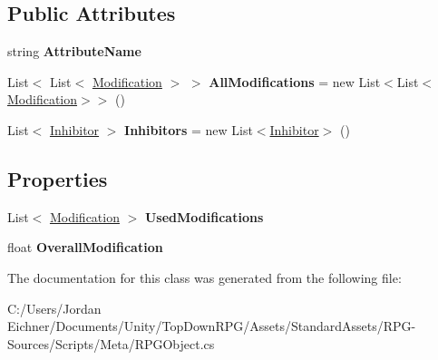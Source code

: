 \subsection*{Public Attributes}
\begin{DoxyCompactItemize}
\item 
\hypertarget{class_r_p_g_object_1_1_attribut_modification_helper_a7d284a483e95ba8c7de9f536f50fd395}{}string {\bfseries Attribute\+Name}\label{class_r_p_g_object_1_1_attribut_modification_helper_a7d284a483e95ba8c7de9f536f50fd395}

\item 
\hypertarget{class_r_p_g_object_1_1_attribut_modification_helper_a16d781421788573ab938f850f57bda0a}{}List$<$ List$<$ \hyperlink{class_r_p_g_object_1_1_attribut_modification_helper_1_1_modification}{Modification} $>$ $>$ {\bfseries All\+Modifications} = new List$<$List$<$\hyperlink{class_r_p_g_object_1_1_attribut_modification_helper_1_1_modification}{Modification}$>$$>$ ()\label{class_r_p_g_object_1_1_attribut_modification_helper_a16d781421788573ab938f850f57bda0a}

\item 
\hypertarget{class_r_p_g_object_1_1_attribut_modification_helper_a6d8cb9272270fecb0d7aaf8df7ef184d}{}List$<$ \hyperlink{class_r_p_g_object_1_1_attribut_modification_helper_1_1_inhibitor}{Inhibitor} $>$ {\bfseries Inhibitors} = new List$<$\hyperlink{class_r_p_g_object_1_1_attribut_modification_helper_1_1_inhibitor}{Inhibitor}$>$ ()\label{class_r_p_g_object_1_1_attribut_modification_helper_a6d8cb9272270fecb0d7aaf8df7ef184d}

\end{DoxyCompactItemize}
\subsection*{Properties}
\begin{DoxyCompactItemize}
\item 
\hypertarget{class_r_p_g_object_1_1_attribut_modification_helper_a420f306ba1d89f6dbfa12f98f7a86a23}{}List$<$ \hyperlink{class_r_p_g_object_1_1_attribut_modification_helper_1_1_modification}{Modification} $>$ {\bfseries Used\+Modifications}\label{class_r_p_g_object_1_1_attribut_modification_helper_a420f306ba1d89f6dbfa12f98f7a86a23}

\item 
\hypertarget{class_r_p_g_object_1_1_attribut_modification_helper_ad17e7c9081ae8e2e5c33dfa4bd114f9b}{}float {\bfseries Overall\+Modification}\label{class_r_p_g_object_1_1_attribut_modification_helper_ad17e7c9081ae8e2e5c33dfa4bd114f9b}

\end{DoxyCompactItemize}


The documentation for this class was generated from the following file\+:\begin{DoxyCompactItemize}
\item 
C\+:/\+Users/\+Jordan Eichner/\+Documents/\+Unity/\+Top\+Down\+R\+P\+G/\+Assets/\+Standard\+Assets/\+R\+P\+G-\/\+Sources/\+Scripts/\+Meta/R\+P\+G\+Object.\+cs\end{DoxyCompactItemize}

